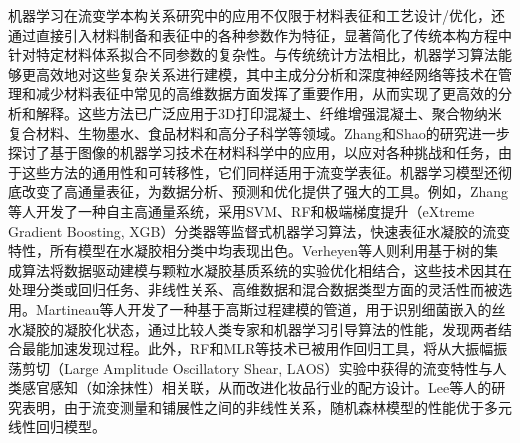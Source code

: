 机器学习在流变学本构关系研究中的应用不仅限于材料表征和工艺设计/优化，还通过直接引入材料制备和表征中的各种参数作为特征，显著简化了传统本构方程中针对特定材料体系拟合不同参数的复杂性。与传统统计方法相比，机器学习算法能够更高效地对这些复杂关系进行建模，其中主成分分析和深度神经网络等技术在管理和减少材料表征中常见的高维数据方面发挥了重要作用，从而实现了更高效的分析和解释。这些方法已广泛应用于3D打印混凝土、纤维增强混凝土、聚合物纳米复合材料、生物墨水、食品材料和高分子科学等领域。Zhang和Shao的研究进一步探讨了基于图像的机器学习技术在材料科学中的应用，以应对各种挑战和任务，由于这些方法的通用性和可转移性，它们同样适用于流变学表征\cite{zhang2022image}。机器学习模型还彻底改变了高通量表征，为数据分析、预测和优化提供了强大的工具。例如，Zhang等人开发了一种自主高通量系统，采用SVM、RF和极端梯度提升（​​eXtreme Gradient Boosting, XGB）分类器等监督式机器学习算法，快速表征水凝胶的流变特性，所有模型在水凝胶相分类中均表现出色\cite{zhangRapidAutonomousHighthroughput2023}。Verheyen等人则利用基于树的集成算法将数据驱动建模与颗粒水凝胶基质系统的实验优化相结合，这些技术因其在处理分类或回归任务、非线性关系、高维数据和混合数据类型方面的灵活性而被选用\cite{verheyenIntegratedDatadrivenModeling2023}。Martineau等人开发了一种基于高斯过程建模的管道，用于识别细菌嵌入的丝水凝胶的凝胶化状态，通过比较人类专家和机器学习引导算法的性能，发现两者结合最能加速发现过程\cite{martineauEngineeringGelationKinetics2022}。此外，RF和MLR等技术已被用作回归工具，将从大振幅振荡剪切（Large Amplitude Oscillatory Shear​​, LAOS）实验中获得的流变特性与人类感官感知（如涂抹性）相关联，从而改进化妆品行业的配方设计。Lee等人的研究表明，由于流变测量和铺展性之间的非线性关系，随机森林模型的性能优于多元线性回归模型\cite{lee2022predictive}。

